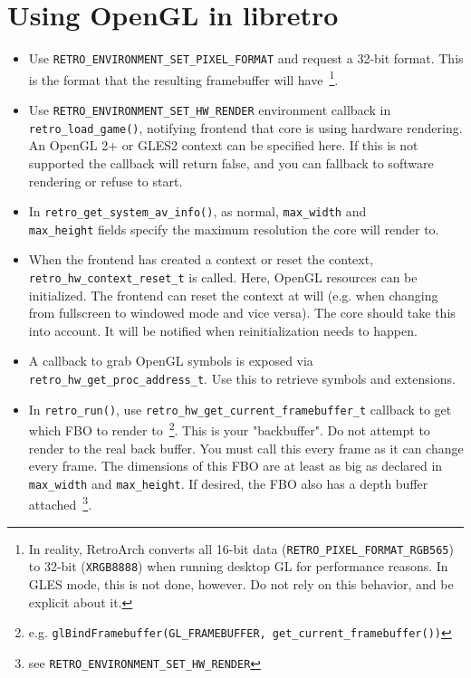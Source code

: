 \documentclass[11pt]{article}
\begin{document}
\section*{Using OpenGL in libretro}

\begin{itemize}
\item Use \texttt{RETRO\_ENVIRONMENT\_SET\_PIXEL\_FORMAT} and request a 32-bit format. This is the format that the resulting framebuffer will have~\footnote{In reality, RetroArch converts all 16-bit data (\texttt{RETRO\_PIXEL\_FORMAT\_RGB565}) to 32-bit (\texttt{XRGB8888}) when running desktop GL for performance reasons. In GLES mode, this is not done, however. Do not rely on this behavior, and be explicit about it.}.

\item Use \texttt{RETRO\_ENVIRONMENT\_SET\_HW\_RENDER} environment callback in \\\texttt{retro\_load\_game()}, notifying frontend that core is using hardware rendering. An OpenGL 2+ or GLES2 context can be specified here. If this is not supported the callback will return false, and you can fallback to software rendering or refuse to start.

\item In \texttt{retro\_get\_system\_av\_info()}, as normal, \texttt{max\_width} and \\\texttt{max\_height} fields specify the maximum resolution the core will render to.

\item When the frontend has created a context or reset the context, \\\texttt{retro\_hw\_context\_reset\_t} is called. Here, OpenGL resources can be initialized.
The frontend can reset the context at will (e.g. when changing from fullscreen to windowed mode and vice versa). The core should take this into account. It will be notified when reinitialization needs to happen.

\item A callback to grab OpenGL symbols is exposed via \\\texttt{retro\_hw\_get\_proc\_address\_t}. Use this to retrieve symbols and extensions.

\item In \texttt{retro\_run()}, use \texttt{retro\_hw\_get\_current\_framebuffer\_t} callback
to get which FBO to render to~\footnote{e.g. \texttt{glBindFramebuffer(GL\_FRAMEBUFFER, get\_current\_framebuffer())}}. This is your "backbuffer". Do not attempt to render to the real back buffer. You must call this every frame as it can change every frame. The dimensions of this FBO are at least as big as declared in \texttt{max\_width} and \texttt{max\_height}. If desired, the FBO also has a depth buffer attached~\footnote{see \texttt{RETRO\_ENVIRONMENT\_SET\_HW\_RENDER}}.


\end{itemize}
\end{document}
